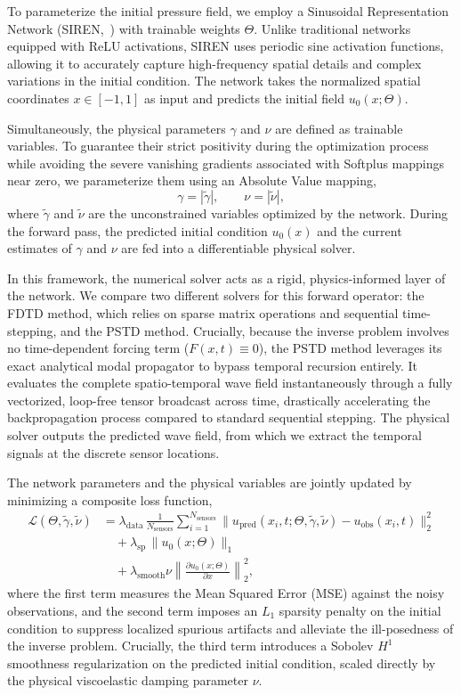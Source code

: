 \documentclass{Configuration_Files/PoliMi3i_thesis}
\begin{document}
To parameterize the initial pressure field, we employ a Sinusoidal Representation Network (SIREN,~\cite{sitzmann_implicit_2020}) with trainable weights $\Theta$. Unlike traditional networks equipped with ReLU activations, SIREN uses periodic sine activation functions, allowing it to accurately capture high-frequency spatial details and complex variations in the initial condition. The network takes the normalized spatial coordinates $x \in [-1, 1]$ as input and predicts the initial field $u_0(x; \Theta)$.

Simultaneously, the physical parameters $\gamma$ and $\nu$ are defined as trainable variables. To guarantee their strict positivity during the optimization process while avoiding the severe vanishing gradients associated with Softplus mappings near zero, we parameterize them using an Absolute Value mapping,
\[
\gamma = |\tilde{\gamma}|, \qquad \nu = |\tilde{\nu}|,
\]
where $\tilde{\gamma}$ and $\tilde{\nu}$ are the unconstrained variables optimized by the network.
During the forward pass, the predicted initial condition $u_0(x)$ and the current estimates of $\gamma$ and $\nu$ are fed into a differentiable physical solver.

In this framework, the numerical solver acts as a rigid, physics-informed layer of the network. We compare two different solvers for this forward operator: the FDTD method, which relies on sparse matrix operations and sequential time-stepping, and the PSTD method. Crucially, because the inverse problem involves no time-dependent forcing term ($F(x,t) \equiv 0$), the PSTD method leverages its exact analytical modal propagator to bypass temporal recursion entirely. It evaluates the complete spatio-temporal wave field instantaneously through a fully vectorized, loop-free tensor broadcast across time, drastically accelerating the backpropagation process compared to standard sequential stepping. The physical solver outputs the predicted wave field, from which we extract the temporal signals at the discrete sensor locations.

The network parameters and the physical variables are jointly updated by minimizing a composite loss function,
\begin{align*}
\mathcal{L}(\Theta, \tilde{\gamma}, \tilde{\nu}) 
&= 
\lambda_{\mathrm{data}} \, \frac{1}{N_{\text{sensors}}} \sum_{i=1}^{N_{\text{sensors}}} \| u_{\text{pred}}(x_i, t; \Theta, \tilde{\gamma}, \tilde{\nu}) - u_{\text{obs}}(x_i, t) \|_2^2 \\
&\quad + 
\lambda_{\text{sp}} \, \| u_0(x; \Theta) \|_1 \\
&\quad +
\lambda_{\text{smooth}} \nu \left\| \frac{\partial u_0(x; \Theta)}{\partial x} \right\|_2^2,
\end{align*}
where the first term measures the Mean Squared Error (MSE) against the noisy observations, and the second term imposes an $L_1$ sparsity penalty on the initial condition to suppress localized spurious artifacts and alleviate the ill-posedness of the inverse problem. Crucially, the third term introduces a Sobolev $H^1$ smoothness regularization on the predicted initial condition, scaled directly by the physical viscoelastic damping parameter $\nu$. 
\end{document}
